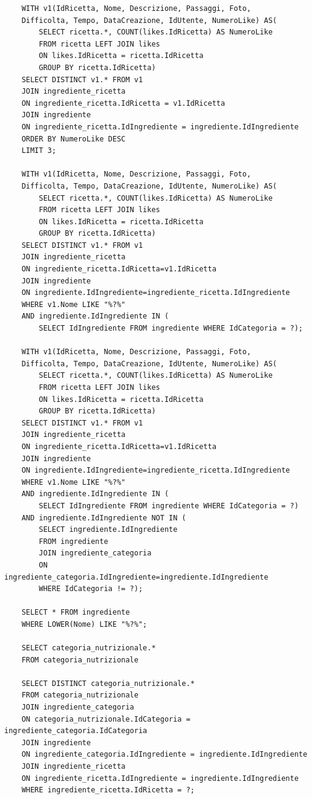 ﻿\documentclass[a4paper,12pt]{report}
\begin{document}
\begin{verbatim}
    WITH v1(IdRicetta, Nome, Descrizione, Passaggi, Foto,
    Difficolta, Tempo, DataCreazione, IdUtente, NumeroLike) AS(
        SELECT ricetta.*, COUNT(likes.IdRicetta) AS NumeroLike
        FROM ricetta LEFT JOIN likes
        ON likes.IdRicetta = ricetta.IdRicetta
        GROUP BY ricetta.IdRicetta)
    SELECT DISTINCT v1.* FROM v1
    JOIN ingrediente_ricetta
    ON ingrediente_ricetta.IdRicetta = v1.IdRicetta
    JOIN ingrediente
    ON ingrediente_ricetta.IdIngrediente = ingrediente.IdIngrediente
    ORDER BY NumeroLike DESC
    LIMIT 3;
    
    WITH v1(IdRicetta, Nome, Descrizione, Passaggi, Foto, 
    Difficolta, Tempo, DataCreazione, IdUtente, NumeroLike) AS(
        SELECT ricetta.*, COUNT(likes.IdRicetta) AS NumeroLike
        FROM ricetta LEFT JOIN likes
        ON likes.IdRicetta = ricetta.IdRicetta
        GROUP BY ricetta.IdRicetta)
    SELECT DISTINCT v1.* FROM v1
    JOIN ingrediente_ricetta
    ON ingrediente_ricetta.IdRicetta=v1.IdRicetta
    JOIN ingrediente
    ON ingrediente.IdIngrediente=ingrediente_ricetta.IdIngrediente
    WHERE v1.Nome LIKE "%?%"
    AND ingrediente.IdIngrediente IN (
        SELECT IdIngrediente FROM ingrediente WHERE IdCategoria = ?);
    
    WITH v1(IdRicetta, Nome, Descrizione, Passaggi, Foto, 
    Difficolta, Tempo, DataCreazione, IdUtente, NumeroLike) AS(
        SELECT ricetta.*, COUNT(likes.IdRicetta) AS NumeroLike
        FROM ricetta LEFT JOIN likes
        ON likes.IdRicetta = ricetta.IdRicetta
        GROUP BY ricetta.IdRicetta)
    SELECT DISTINCT v1.* FROM v1
    JOIN ingrediente_ricetta
    ON ingrediente_ricetta.IdRicetta=v1.IdRicetta
    JOIN ingrediente
    ON ingrediente.IdIngrediente=ingrediente_ricetta.IdIngrediente
    WHERE v1.Nome LIKE "%?%"
    AND ingrediente.IdIngrediente IN (
        SELECT IdIngrediente FROM ingrediente WHERE IdCategoria = ?)
    AND ingrediente.IdIngrediente NOT IN (
        SELECT ingrediente.IdIngrediente
        FROM ingrediente
        JOIN ingrediente_categoria
        ON ingrediente_categoria.IdIngrediente=ingrediente.IdIngrediente
        WHERE IdCategoria != ?);
    
    SELECT * FROM ingrediente
    WHERE LOWER(Nome) LIKE "%?%";
    
    SELECT categoria_nutrizionale.*
    FROM categoria_nutrizionale
    
    SELECT DISTINCT categoria_nutrizionale.*
    FROM categoria_nutrizionale
    JOIN ingrediente_categoria
    ON categoria_nutrizionale.IdCategoria = ingrediente_categoria.IdCategoria
    JOIN ingrediente
    ON ingrediente_categoria.IdIngrediente = ingrediente.IdIngrediente
    JOIN ingrediente_ricetta
    ON ingrediente_ricetta.IdIngrediente = ingrediente.IdIngrediente
    WHERE ingrediente_ricetta.IdRicetta = ?;
    

\end{verbatim}
\end{document}
